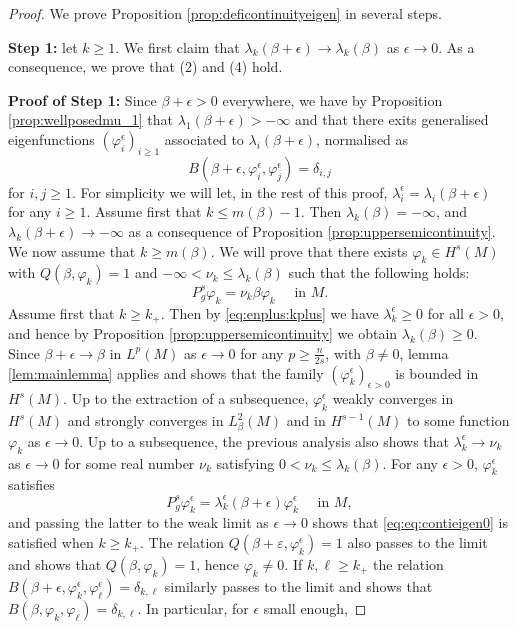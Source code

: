 \documentclass[10pt]{amsart}
\numberwithin{equation}{section}
\def\ep{{\varepsilon}}
\newcommand{\ve}{\varepsilon}
\newcommand{\vp}{\varphi}
\def \ep{\epsilon}
\theoremstyle{plain}
\theoremstyle{remark}
\begin{document}
\begin{proof}
We prove Proposition \ref{prop:deficontinuityeigen} in several steps. 

\medskip

\textbf{Step 1:} let $k \ge 1$. We first claim that $\lambda_k(\beta + \epsilon) \to \lambda_k(\beta)$ as $\epsilon \to 0$. As a consequence, we prove that (2) and (4) hold. 

\medskip 


\textbf{Proof of Step 1:} 
Since $\beta+\ep >0$ everywhere, we have by Proposition \ref{prop:wellposedmu_1} that $\lambda_1(\beta + \ep ) > -\infty$ and that there exits generalised eigenfunctions $(\vp_i^\epsilon)_{i\geq 1}$ associated to $\lambda_i(\beta + \epsilon)$, normalised as 
$$B(\beta+\epsilon,\vp_i^\epsilon,\vp_j^\epsilon) = \delta_{i,j}$$ 
for $i,j \geq 1$.  For simplicity we will let, in the rest of this proof, $\lambda_i^{\epsilon} = \lambda_i(\beta+\epsilon)$ for any $i \ge 1$. Assume first that $k \le m(\beta)-1$. 
Then $\lambda_k(\beta) = -\infty$, and $\lambda_k(\beta + \ep) \to -\infty$ as a consequence of Proposition \ref{prop:uppersemicontinuity}. 
We now assume that $k\ge m(\beta)$. We will prove that there exists $\varphi_k \in H^s(M)$ with $Q(\beta, \varphi_k) = 1$ and $- \infty < \nu_k \le \lambda_k(\beta)$ such that the following holds: 
\begin{equation} \label{eq:eq:contieigen0}
P_g^s \vp_k = \nu_k \beta \vp_k \quad \text{ in } M. 
\end{equation}
Assume first that $k \ge k_+$. Then by \eqref{eq:enplus:kplus} we have $\lambda_k^\ep \geq 0$ for all $\ep >0$, and hence by Proposition \ref{prop:uppersemicontinuity} we obtain $\lambda_k(\beta)\geq 0$. Since $\beta + \epsilon \to \beta$ in $L^p(M)$ as $\epsilon \to 0$ for any $p \ge \frac{n}{2s}$, with $\beta\neq 0$, lemma \ref{lem:mainlemma} applies and shows that the family $(\vp_k^\epsilon)_{\epsilon >0}$ is bounded in $H^s(M)$. Up to the extraction of a subsequence, $\vp_k^\epsilon$ weakly converges  in $H^s(M)$ and strongly converges in $L^2_\beta(M)$ and in $H^{s-1}(M)$ to some function $\vp_k$ as $\ep \to 0$. Up to a subsequence, the previous analysis also shows that $\lambda_k^\epsilon \to \nu_k$ as $\epsilon \to 0$ for some real number $\nu_k$ satisfying $0 < \nu_k \leq \lambda_k(\beta)$. For any $\epsilon >0$, $\vp_k^{\epsilon}$ satisfies 
$$P_g^s \vp_k^{\epsilon} = \lambda_k^{\epsilon}(\beta + \ep) \vp_k^{\epsilon} \quad \text{ in } M, $$
and passing the latter to the weak limit as $\epsilon \to 0$ shows that \eqref{eq:eq:contieigen0} is satisfied when $k \ge k_+$. The relation $Q(\beta+\ve, \vp_k^{\ep} )=1$ also passes to the limit and shows that $Q(\beta, \vp_k) = 1$, hence $\vp_k \neq 0$. If $k, \ell \ge k_+$ the relation $B(\beta+\epsilon,\vp_k^\epsilon,\vp_\ell^\epsilon) = \delta_{k,\ell}$ similarly passes to the limit and shows that $ B(\beta,\vp_k,\vp_\ell) = \delta_{k,\ell}$.  In particular, for $\ep$ small enough,

\end{proof}
\end{document}
